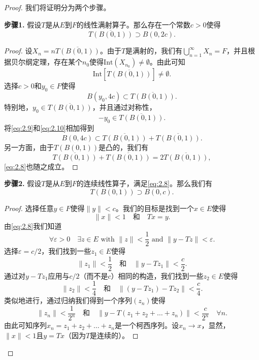\begin{proof}
我们将证明分为两个步骤。

\textbf{步骤1.} 假设$T$是从$E$到$F$的线性满射算子。那么存在一个常数$c>0$使得
\begin{equation}
\overline{T(B(0,1))} \supset B(0, 2c). \label{eq:2.8}
\end{equation}
\begin{proof}
设$X_n = n\overline{T(B(0,1))}$。由于$T$是满射的，我们有$\bigcup_{n=1}^\infty X_n = F$，并且根据贝尔纲定理，存在某个$n_0$使得$\text{Int}(X_{n_0}) \neq \emptyset$。由此可知
\[
\text{Int}[\overline{T(B(0,1))}] \neq \emptyset.
\]
选择$c>0$和$y_0 \in F$使得
\begin{equation}
B(y_0, 4c) \subset \overline{T(B(0,1))}. \label{eq:2.9}
\end{equation}
特别地，$y_0 \in \overline{T(B(0,1))}$，并且通过对称性，
\begin{equation}
-y_0 \in \overline{T(B(0,1))}. \label{eq:2.10}
\end{equation}
将\eqref{eq:2.9}和\eqref{eq:2.10}相加得到
\[
B(0, 4c) \subset \overline{T(B(0,1))} + \overline{T(B(0,1))}.
\]
另一方面，由于$T(B(0,1))$是凸的，我们有
\[
\overline{T(B(0,1))} + \overline{T(B(0,1))} = 2\overline{T(B(0,1))},
\]
\eqref{eq:2.8}也随之成立。
\end{proof}

\textbf{步骤2.} 假设$T$是从$E$到$F$的连续线性算子，满足\eqref{eq:2.8}。那么我们有
\begin{equation}
T(B(0,1)) \supset B(0,c). \label{eq:2.11}
\end{equation}
\begin{proof}
选择任意$y \in F$使得$\|y\|<c$。我们的目标是找到一个$x \in E$使得
\[
\|x\| < 1 \quad \text{和} \quad Tx=y.
\]
由\eqref{eq:2.8}我们知道
\begin{equation}
\forall \varepsilon > 0 \quad \exists z \in E \text{ with } \|z\| < \frac{1}{2} \text{ and } \|y - Tz\| < \varepsilon. \label{eq:2.12}
\end{equation}
选择$\varepsilon = c/2$，我们找到一些$z_1 \in E$使得
\[
\|z_1\| < \frac{1}{2} \quad \text{和} \quad \|y-Tz_1\| < \frac{c}{2}.
\]
通过对$y-Tz_1$应用与$c/2$（而不是$c$）相同的构造，我们找到一些$z_2 \in E$使得
\[
\|z_2\| < \frac{1}{4} \quad \text{和} \quad \|(y-Tz_1) - Tz_2\| < \frac{c}{4}.
\]
类似地进行，通过归纳我们得到一个序列$(z_n)$使得
\[
\|z_n\| < \frac{1}{2^n} \quad \text{和} \quad \|y-T(z_1+z_2+\dots+z_n)\| < \frac{c}{2^n} \quad \forall n.
\]
由此可知序列$x_n = z_1+z_2+\dots+z_n$是一个柯西序列。设$x_n \to x$，显然，$\|x\| < 1$且$y=Tx$（因为$T$是连续的）。
\end{proof}
\end{proof}


